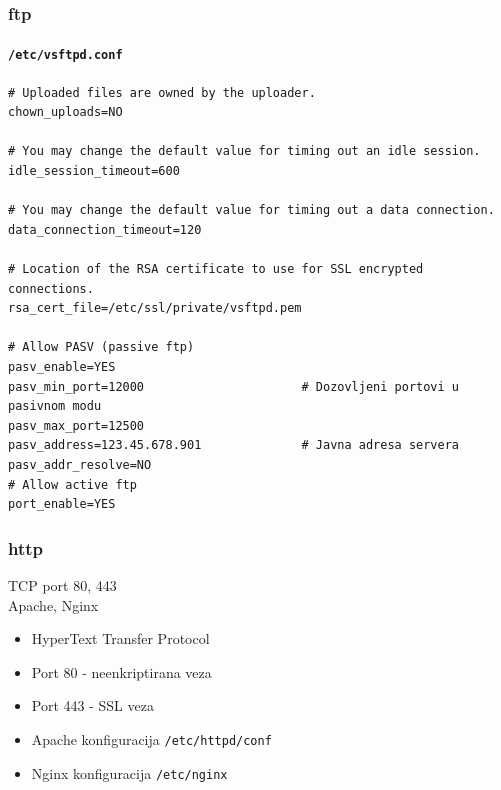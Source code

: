 \documentclass[t,table,usenames,dvipsnames]{beamer}
\begin{document}
\begin{frame}[fragile]
	\frametitle{ftp}
	\framesubtitle{\texttt{/etc/vsftpd.conf}}
	\scriptsize
	\begin{verbatim}
# Uploaded files are owned by the uploader.
chown_uploads=NO

# You may change the default value for timing out an idle session.
idle_session_timeout=600

# You may change the default value for timing out a data connection.
data_connection_timeout=120

# Location of the RSA certificate to use for SSL encrypted connections.
rsa_cert_file=/etc/ssl/private/vsftpd.pem

# Allow PASV (passive ftp)
pasv_enable=YES
pasv_min_port=12000                      # Dozovljeni portovi u pasivnom modu
pasv_max_port=12500
pasv_address=123.45.678.901              # Javna adresa servera
pasv_addr_resolve=NO
# Allow active ftp
port_enable=YES
	\end{verbatim}


\end{frame}







\begin{frame}
	\frametitle{http}
	
	TCP port 80, 443\\
	Apache, Nginx
	
	\begin{itemize}
		\item[] HyperText Transfer Protocol
		
		\item[] Port 80 - neenkriptirana veza
		\item[] Port 443 - SSL veza
	\end{itemize}
	
	\begin{itemize}
		\item[] Apache konfiguracija \texttt{/etc/httpd/conf}
		\item[] Nginx konfiguracija \texttt{/etc/nginx}
	\end{itemize}

\end{frame}
\end{document}
